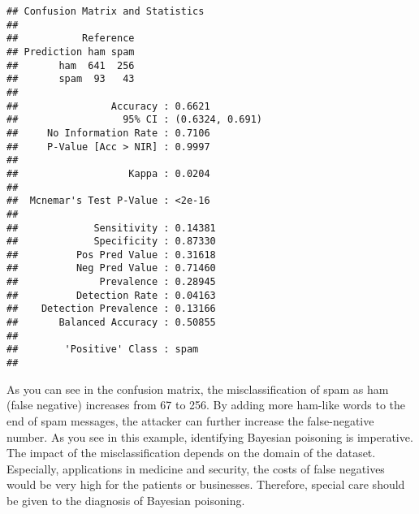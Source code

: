 \documentclass[]{article}
\begin{document}
\begin{verbatim}
## Confusion Matrix and Statistics
## 
##           Reference
## Prediction ham spam
##       ham  641  256
##       spam  93   43
##                                          
##                Accuracy : 0.6621         
##                  95% CI : (0.6324, 0.691)
##     No Information Rate : 0.7106         
##     P-Value [Acc > NIR] : 0.9997         
##                                          
##                   Kappa : 0.0204         
##                                          
##  Mcnemar's Test P-Value : <2e-16         
##                                          
##             Sensitivity : 0.14381        
##             Specificity : 0.87330        
##          Pos Pred Value : 0.31618        
##          Neg Pred Value : 0.71460        
##              Prevalence : 0.28945        
##          Detection Rate : 0.04163        
##    Detection Prevalence : 0.13166        
##       Balanced Accuracy : 0.50855        
##                                          
##        'Positive' Class : spam           
## 
\end{verbatim}

As you can see in the confusion matrix, the misclassification of spam as
ham (false negative) increases from 67 to 256. By adding more ham-like
words to the end of spam messages, the attacker can further increase the
false-negative number. As you see in this example, identifying Bayesian
poisoning is imperative. The impact of the misclassification depends on
the domain of the dataset. Especially, applications in medicine and
security, the costs of false negatives would be very high for the
patients or businesses. Therefore, special care should be given to the
diagnosis of Bayesian poisoning.
\end{document}
